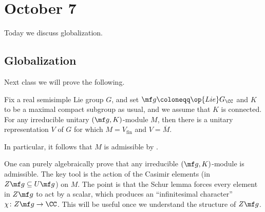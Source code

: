 \documentclass[../notes.tex]{subfiles}
\begin{document}
\section{October 7}
Today we discuss globalization.

\subsection{Globalization}
Next class we will prove the following.
\begin{theorem} \label{thm:hc-global}
	Fix a real semisimple Lie group $G$, and set $\mf g\coloneqq\op{Lie}G_\CC$ and $K$ to be a maximal compact subgroup as usual, and we assume that $K$ is connected. For any irreducible unitary $(\mf g,K)$-module $M$, then there is a unitary representation $V$ of $G$ for which $M=V_{\mathrm{fin}}$ and $V=\overline M$.
\end{theorem}
\begin{remark}
	In particular, it follows that $M$ is admissible by .
\end{remark}
\begin{remark}
	One can purely algebraically prove that any irreducible $(\mf g,K)$-module is admissible. The key tool is the action of the Casimir elements (in $Z\mf g\subseteq U\mf g$) on $M$. The point is that the Schur lemma forces every element in $Z\mf g$ to act by a scalar, which produces an ``infinitesimal character'' $\chi\colon Z\mf g\to\CC$. This will be useful once we understand the structure of $Z\mf g$.
\end{remark}
\end{document}
